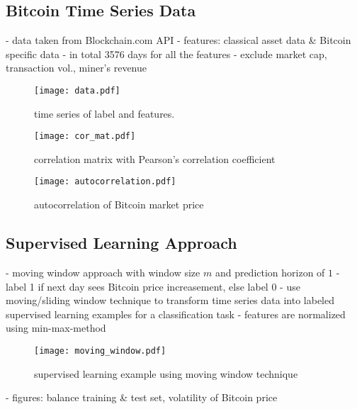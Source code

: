 \subsection{Bitcoin Time Series Data}

- data taken from Blockchain.com API \cite{Data}
- features: classical asset data \& Bitcoin specific data
- in total 3576 days for all the features
- exclude market cap, transaction vol., miner's revenue

\begin{figure}
  \centering
  \texttt{[image: data.pdf]}
  \caption{time series of label and features.}
\end{figure}

\begin{figure}
  \centering
  \texttt{[image: cor\_mat.pdf]}
  \caption{correlation matrix with Pearson's correlation coefficient}
\end{figure}

\begin{figure}
	\centering
	\texttt{[image: autocorrelation.pdf]}
    \caption{autocorrelation of Bitcoin market price}
\end{figure}

\subsection{Supervised Learning Approach}
- moving window approach with window size $m$ and prediction horizon of $1$
- label 1 if next day sees Bitcoin price increasement, else label 0
- use moving/sliding window technique to transform time series data into labeled supervised learning examples for a classification task
- features are normalized using min-max-method

\begin{figure}
	\centering
	\texttt{[image: moving\_window.pdf]}
    \caption{supervised learning example using moving window technique}
\end{figure}

- figures: balance training \& test set, volatility of Bitcoin price